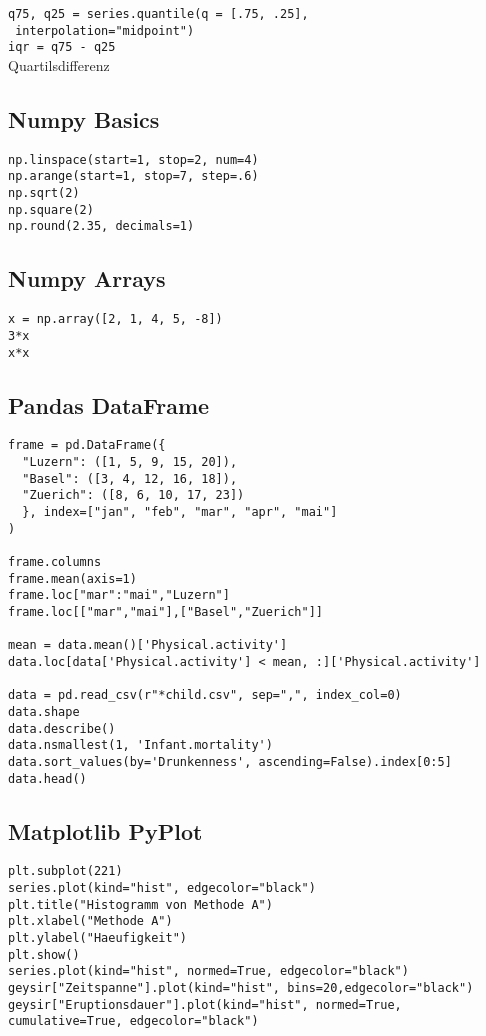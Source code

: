 \documentclass[14pt]{article}
\begin{document}
\begin{multicols}{3}
\texttt{q75, q25 = series.quantile(q = [.75, .25], \ } \\
\texttt{	interpolation="midpoint")} \\
\texttt{iqr = q75 - q25} \\
Quartilsdifferenz

\subsection*{Numpy Basics}
\begin{verbatim}
np.linspace(start=1, stop=2, num=4)
np.arange(start=1, stop=7, step=.6)
np.sqrt(2)
np.square(2)
np.round(2.35, decimals=1)
\end{verbatim}

\subsection*{Numpy Arrays}
\begin{verbatim}
x = np.array([2, 1, 4, 5, -8])
3*x
x*x
\end{verbatim}

\subsection*{Pandas DataFrame}
\begin{verbatim}
frame = pd.DataFrame({
  "Luzern": ([1, 5, 9, 15, 20]),
  "Basel": ([3, 4, 12, 16, 18]),
  "Zuerich": ([8, 6, 10, 17, 23])
  }, index=["jan", "feb", "mar", "apr", "mai"]
)

frame.columns
frame.mean(axis=1)
frame.loc["mar":"mai","Luzern"]
frame.loc[["mar","mai"],["Basel","Zuerich"]]

mean = data.mean()['Physical.activity']
data.loc[data['Physical.activity'] < mean, :]['Physical.activity']

data = pd.read_csv(r"*child.csv", sep=",", index_col=0)
data.shape
data.describe()
data.nsmallest(1, 'Infant.mortality')
data.sort_values(by='Drunkenness', ascending=False).index[0:5]
data.head()
\end{verbatim}

\subsection*{Matplotlib PyPlot}
\begin{verbatim}
plt.subplot(221)
series.plot(kind="hist", edgecolor="black")
plt.title("Histogramm von Methode A")
plt.xlabel("Methode A")
plt.ylabel("Haeufigkeit")
plt.show()
series.plot(kind="hist", normed=True, edgecolor="black")
geysir["Zeitspanne"].plot(kind="hist", bins=20,edgecolor="black")
geysir["Eruptionsdauer"].plot(kind="hist", normed=True, cumulative=True, edgecolor="black")
\end{verbatim}

\end{multicols}
\end{document}
